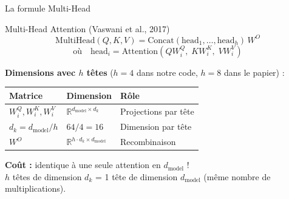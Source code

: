 \documentclass[aspectratio=169, 11pt]{beamer}
\begin{document}
\begin{frame}{La formule Multi-Head}
\begin{block}{Multi-Head Attention (Vaswani et al., 2017)}
\vspace{-0.5em}
\[
\boxed{\text{MultiHead}(Q, K, V) = \text{Concat}(\text{head}_1, \dots, \text{head}_h) \, W^O}
\]
\[
\text{où} \quad \text{head}_i = \text{Attention}(Q W_i^Q, \; K W_i^K, \; V W_i^V)
\]
\end{block}

\vspace{0.3em}

\textbf{Dimensions avec $h$ têtes} ($h = 4$ dans notre code, $h = 8$ dans le papier) :

\vspace{0.3em}

\begin{center}
\begin{tabular}{lll}
\toprule
\textbf{Matrice} & \textbf{Dimension} & \textbf{Rôle} \\
\midrule
$W_i^Q, W_i^K, W_i^V$ & $\mathbb{R}^{d_{\text{model}} \times d_k}$ & Projections par tête \\
$d_k = d_{\text{model}} / h$ & $64 / 4 = 16$ & Dimension par tête \\
$W^O$ & $\mathbb{R}^{h \cdot d_k \times d_{\text{model}}}$ & Recombinaison \\
\bottomrule
\end{tabular}
\end{center}

\vspace{0.3em}
\textbf{Coût :} identique à une seule attention en $d_{\text{model}}$ ! \\
$h$ têtes de dimension $d_k$ = 1 tête de dimension $d_{\text{model}}$ (même nombre de multiplications).
\end{frame}
\end{document}

